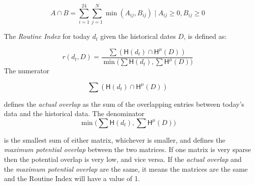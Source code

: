\begin{equation}
\label{eq:overlap-function}
    A \cap B = \sum_{i=1}^{24} \sum_{j=1}^{N} \min (A_{ij}, B_{ij}) \;|\; A_{ij} \geq 0, B_{ij} \geq 0
\end{equation}

The \textit{Routine Index} for today $d_t$ given the historical dates $D$, is defined as: 

$$r(d_t, D) = \frac{\sum (\mathsf{H}(d_t) \cap \mathsf{H}^{\mu} (D) )}{\min \Big(\sum \mathsf{H}(d_t), \sum \mathsf{H}^{\mu} (D) \Big)}$$
The numerator 

$$\sum (\mathsf{H}(d_t) \cap \mathsf{H}^{\mu} (D) )$$

defines the \textit{actual overlap} as the sum of the overlapping entries between today's data and the historical data. The denominator 
$$\min \Big(\sum \mathsf{H}(d_t), \sum \mathsf{H}^{\mu} (D) \Big)$$ 

is the smallest sum of either matrix, whichever is smaller, and defines the \textit{maximum potential overlap} between the two matrices. If one matrix is very sparse then the potential overlap is very low, and vice versa. If the \textit{actual overlap} and the \textit{maximum potential overlap} are the same, it means the matrices are the same and the Routine Index will have a value of 1. 

